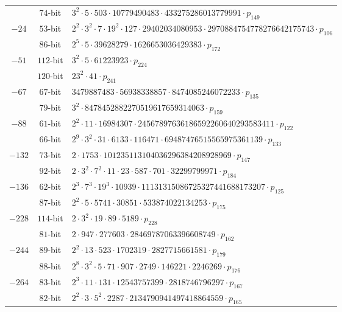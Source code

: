 \documentclass{article}
\theoremstyle{definition}
\begin{document}
\begin{table}[!ht]
\begin{tabularx}{\textwidth}{ccl}
 & $74$-bit & $3^{2}  \cdot 5  \cdot 503  \cdot 10779490483  \cdot 433275286013779991  \cdot p_{149}$\\
$-24$ & $53$-bit & $2^{2}  \cdot 3^{2}  \cdot 7  \cdot 19^{2}  \cdot 127  \cdot 29402034080953  \cdot 2970884754778276642175743  \cdot p_{106}$\\
 & $86$-bit & $2^{5}  \cdot 5  \cdot 39628279  \cdot 1626653036429383  \cdot p_{172}$\\
$-51$ & $112$-bit & $3^{2}  \cdot 5  \cdot 61223923  \cdot p_{224}$\\
 & $120$-bit & $23^{2}  \cdot 41  \cdot p_{241}$\\
$-67$ & $67$-bit & $3479887483  \cdot 56938338857  \cdot 8474085246072233  \cdot p_{135}$\\
 & $79$-bit & $3^{2}  \cdot 8478452882270519617659314063  \cdot p_{159}$\\
$-88$ & $61$-bit & $2^{2}  \cdot 11  \cdot 16984307  \cdot 24567897636186592260640293583411  \cdot p_{122}$\\
 & $66$-bit & $2^{9}  \cdot 3^{2}  \cdot 31  \cdot 6133  \cdot 116471  \cdot 69487476515565975361139  \cdot p_{133}$\\
$-132$ & $73$-bit & $2  \cdot 1753  \cdot 101235113104036296384208928969  \cdot p_{147}$\\
 & $92$-bit & $2  \cdot 3^{2}  \cdot 7^{2}  \cdot 11  \cdot 23  \cdot 587  \cdot 701  \cdot 32299799971  \cdot p_{184}$\\
$-136$ & $62$-bit & $2^{3}  \cdot 7^{3}  \cdot 19^{3}  \cdot 10939  \cdot 11131315086725327441688173207  \cdot p_{125}$\\
 & $87$-bit & $2^{2}  \cdot 5  \cdot 5741  \cdot 30851  \cdot 533874022134253  \cdot p_{175}$\\
$-228$ & $114$-bit & $2  \cdot 3^{2}  \cdot 19  \cdot 89  \cdot 5189  \cdot p_{228}$\\
 & $81$-bit & $2  \cdot 947  \cdot 277603  \cdot 28469787063396608749  \cdot p_{162}$\\
$-244$ & $89$-bit & $2^{2}  \cdot 13  \cdot 523  \cdot 1702319  \cdot 2827715661581  \cdot p_{179}$\\
 & $88$-bit & $2^{8}  \cdot 3^{2}  \cdot 5  \cdot 71  \cdot 907  \cdot 2749  \cdot 146221  \cdot 2246269  \cdot p_{176}$\\
$-264$ & $83$-bit & $2^{3}  \cdot 11  \cdot 131  \cdot 12543757399  \cdot 2818746796297  \cdot p_{167}$\\
 & $82$-bit & $2^{2}  \cdot 3  \cdot 5^{2}  \cdot 2287  \cdot 2134790941497418864559  \cdot p_{165}$\\

\end{tabularx}
\end{table}
\end{document}
